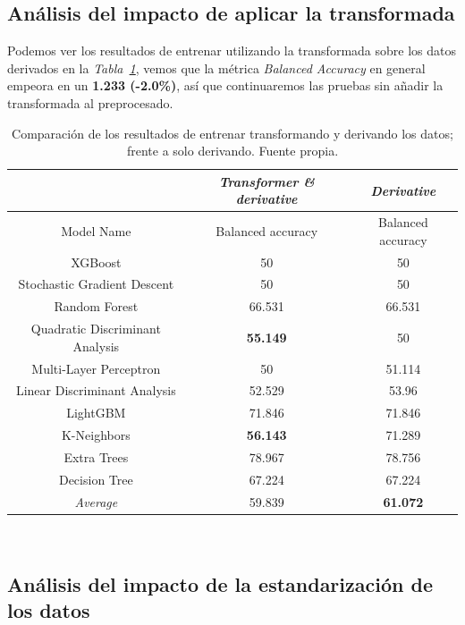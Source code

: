 \subsection{Análisis del impacto de aplicar la transformada}

Podemos ver los resultados de entrenar utilizando la transformada sobre los datos derivados en la \textit{Tabla\ \ref{tab:derivative-transformed-results}}, vemos que la métrica \textit{Balanced Accuracy} en general empeora en un \textbf{1.233 (-2.0\%)}, así que continuaremos las pruebas sin añadir la transformada al preprocesado.

\begin{table}[!h]
    \centering
    \begin{tabular}{|c|c|c|}
        \hline
            & \textit{Transformer \& derivative} & \textit{Derivative} \\ \hline
            Model Name & Balanced accuracy & Balanced accuracy \\ \hline
            XGBoost & 50 & 50 \\ 
            Stochastic Gradient Descent & 50 & 50 \\ 
            Random Forest & 66.531 & 66.531 \\ 
            Quadratic Discriminant Analysis & \textbf{55.149} & 50 \\ 
            Multi-Layer Perceptron & 50 & 51.114 \\ 
            Linear Discriminant Analysis & 52.529 & 53.96 \\ 
            LightGBM & 71.846 & 71.846 \\ 
            K-Neighbors & \textbf{56.143} & 71.289 \\ 
            Extra Trees & 78.967 & 78.756 \\ 
            Decision Tree & 67.224 & 67.224 \\ \hline
            \textit{Average} & 59.839 & \textbf{61.072} \\ \hline
    \end{tabular}
    \caption{Comparación de los resultados de entrenar transformando y derivando los datos; frente a solo derivando. Fuente propia.}\ \label{tab:derivative-transformed-results}
\end{table}

\subsection{Análisis del impacto de la estandarización de los datos}

